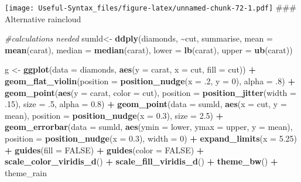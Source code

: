 \documentclass[
]{article}
\newenvironment{Shaded}{\begin{snugshade}}{\end{snugshade}}
\newcommand{\AttributeTok}[1]{\textcolor[rgb]{0.13,0.29,0.53}{#1}}
\newcommand{\CommentTok}[1]{\textcolor[rgb]{0.56,0.35,0.01}{\textit{#1}}}
\newcommand{\ConstantTok}[1]{\textcolor[rgb]{0.56,0.35,0.01}{#1}}
\newcommand{\DecValTok}[1]{\textcolor[rgb]{0.00,0.00,0.81}{#1}}
\newcommand{\FloatTok}[1]{\textcolor[rgb]{0.00,0.00,0.81}{#1}}
\newcommand{\FunctionTok}[1]{\textcolor[rgb]{0.13,0.29,0.53}{\textbf{#1}}}
\newcommand{\NormalTok}[1]{#1}
\newcommand{\OtherTok}[1]{\textcolor[rgb]{0.56,0.35,0.01}{#1}}
\newcommand{\SpecialCharTok}[1]{\textcolor[rgb]{0.81,0.36,0.00}{\textbf{#1}}}
\begin{document}
\texttt{[image: Useful-Syntax\_files/figure-latex/unnamed-chunk-72-1.pdf]}
\#\#\# Alternative raincloud

\begin{Shaded}
\begin{Highlighting}[]
\CommentTok{\#calculations needed}
\NormalTok{sumld}\OtherTok{\textless{}{-}} \FunctionTok{ddply}\NormalTok{(diamonds, }\SpecialCharTok{\textasciitilde{}}\NormalTok{cut, summarise, }\AttributeTok{mean =} \FunctionTok{mean}\NormalTok{(carat), }\AttributeTok{median =} \FunctionTok{median}\NormalTok{(carat), }\AttributeTok{lower =} \FunctionTok{lb}\NormalTok{(carat), }\AttributeTok{upper =} \FunctionTok{ub}\NormalTok{(carat))}

\NormalTok{g }\OtherTok{\textless{}{-}} \FunctionTok{ggplot}\NormalTok{(}\AttributeTok{data =}\NormalTok{ diamonds, }\FunctionTok{aes}\NormalTok{(}\AttributeTok{y =}\NormalTok{ carat, }\AttributeTok{x =}\NormalTok{ cut, }\AttributeTok{fill =}\NormalTok{ cut)) }\SpecialCharTok{+}
\FunctionTok{geom\_flat\_violin}\NormalTok{(}\AttributeTok{position =} \FunctionTok{position\_nudge}\NormalTok{(}\AttributeTok{x =}\NormalTok{ .}\DecValTok{2}\NormalTok{, }\AttributeTok{y =} \DecValTok{0}\NormalTok{), }\AttributeTok{alpha =}\NormalTok{ .}\DecValTok{8}\NormalTok{) }\SpecialCharTok{+}
\FunctionTok{geom\_point}\NormalTok{(}\FunctionTok{aes}\NormalTok{(}\AttributeTok{y =}\NormalTok{ carat, }\AttributeTok{color =}\NormalTok{ cut), }\AttributeTok{position =} \FunctionTok{position\_jitter}\NormalTok{(}\AttributeTok{width =}\NormalTok{ .}\DecValTok{15}\NormalTok{), }\AttributeTok{size =}\NormalTok{ .}\DecValTok{5}\NormalTok{, }\AttributeTok{alpha =} \FloatTok{0.8}\NormalTok{) }\SpecialCharTok{+}
\FunctionTok{geom\_point}\NormalTok{(}\AttributeTok{data =}\NormalTok{ sumld, }\FunctionTok{aes}\NormalTok{(}\AttributeTok{x =}\NormalTok{ cut, }\AttributeTok{y =}\NormalTok{ mean), }\AttributeTok{position =} \FunctionTok{position\_nudge}\NormalTok{(}\AttributeTok{x =} \FloatTok{0.3}\NormalTok{), }\AttributeTok{size =} \FloatTok{2.5}\NormalTok{) }\SpecialCharTok{+}
\FunctionTok{geom\_errorbar}\NormalTok{(}\AttributeTok{data =}\NormalTok{ sumld, }\FunctionTok{aes}\NormalTok{(}\AttributeTok{ymin =}\NormalTok{ lower, }\AttributeTok{ymax =}\NormalTok{ upper, }\AttributeTok{y =}\NormalTok{ mean), }\AttributeTok{position =} \FunctionTok{position\_nudge}\NormalTok{(}\AttributeTok{x =} \FloatTok{0.3}\NormalTok{), }\AttributeTok{width =} \DecValTok{0}\NormalTok{) }\SpecialCharTok{+}
\FunctionTok{expand\_limits}\NormalTok{(}\AttributeTok{x =} \FloatTok{5.25}\NormalTok{) }\SpecialCharTok{+}
\FunctionTok{guides}\NormalTok{(}\AttributeTok{fill =} \ConstantTok{FALSE}\NormalTok{) }\SpecialCharTok{+}
\FunctionTok{guides}\NormalTok{(}\AttributeTok{color =} \ConstantTok{FALSE}\NormalTok{) }\SpecialCharTok{+}
\FunctionTok{scale\_color\_viridis\_d}\NormalTok{() }\SpecialCharTok{+}
\FunctionTok{scale\_fill\_viridis\_d}\NormalTok{() }\SpecialCharTok{+}
\FunctionTok{theme\_bw}\NormalTok{() }\SpecialCharTok{+}
\NormalTok{theme\_rain}
\end{Highlighting}
\end{Shaded}
\end{document}
